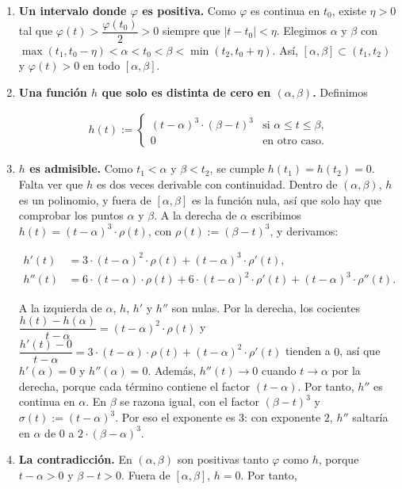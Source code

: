 \documentclass[11pt,a4paper,spanish]{book}
\begin{document}
\begin{enumerate}
\def\labelenumi{\arabic{enumi}.}
\item
  \textbf{Un intervalo donde \(\varphi\) es positiva.} Como \(\varphi\)
  es continua en \(t_0\), existe \(\eta > 0\) tal que
  \(\varphi(t) > \dfrac{\varphi(t_0)}{2} > 0\) siempre que
  \(|t - t_0| < \eta\). Elegimos \(\alpha\) y \(\beta\) con
  \(\max(t_1, t_0 - \eta) < \alpha < t_0 < \beta < \min(t_2, t_0 + \eta)\).
  Así, \([\alpha, \beta] \subset (t_1, t_2)\) y \(\varphi(t) > 0\) en
  todo \([\alpha, \beta]\).
\item
  \textbf{Una función \(h\) que solo es distinta de cero en
  \((\alpha, \beta)\).} Definimos

  \[
  \begin{aligned}
  h(t) := \begin{cases} (t - \alpha)^3 \cdot (\beta - t)^3 & \text{si } \alpha \leq t \leq \beta, \\ 0 & \text{en otro caso.} \end{cases}
  \end{aligned}
  \]
\item
  \textbf{\(h\) es admisible.} Como \(t_1 < \alpha\) y \(\beta < t_2\),
  se cumple \(h(t_1) = h(t_2) = 0\). Falta ver que \(h\) es dos veces
  derivable con continuidad. Dentro de \((\alpha, \beta)\), \(h\) es un
  polinomio, y fuera de \([\alpha, \beta]\) es la función nula, así que
  solo hay que comprobar los puntos \(\alpha\) y \(\beta\). A la derecha
  de \(\alpha\) escribimos \(h(t) = (t - \alpha)^3 \cdot \rho(t)\), con
  \(\rho(t) := (\beta - t)^3\), y derivamos:

  \[
  \begin{aligned}
  h'(t) &= 3 \cdot (t - \alpha)^2 \cdot \rho(t) + (t - \alpha)^3 \cdot \rho'(t), \\
  h''(t) &= 6 \cdot (t - \alpha) \cdot \rho(t) + 6 \cdot (t - \alpha)^2 \cdot \rho'(t) + (t - \alpha)^3 \cdot \rho''(t).
  \end{aligned}
  \]

  A la izquierda de \(\alpha\), \(h\), \(h'\) y \(h''\) son nulas. Por
  la derecha, los cocientes
  \(\dfrac{h(t) - h(\alpha)}{t - \alpha} = (t - \alpha)^2 \cdot \rho(t)\)
  y
  \(\dfrac{h'(t) - 0}{t - \alpha} = 3 \cdot (t - \alpha) \cdot \rho(t) + (t - \alpha)^2 \cdot \rho'(t)\)
  tienden a \(0\), así que \(h'(\alpha) = 0\) y \(h''(\alpha) = 0\).
  Además, \(h''(t) \to 0\) cuando \(t \to \alpha\) por la derecha,
  porque cada término contiene el factor \((t - \alpha)\). Por tanto,
  \(h''\) es continua en \(\alpha\). En \(\beta\) se razona igual, con
  el factor \((\beta - t)^3\) y \(\sigma(t) := (t - \alpha)^3\). Por eso
  el exponente es \(3\): con exponente \(2\), \(h''\) saltaría en
  \(\alpha\) de \(0\) a \(2 \cdot (\beta - \alpha)^3\).
\item
  \textbf{La contradicción.} En \((\alpha, \beta)\) son positivas tanto
  \(\varphi\) como \(h\), porque \(t - \alpha > 0\) y \(\beta - t > 0\).
  Fuera de \([\alpha, \beta]\), \(h = 0\). Por tanto,


\end{enumerate}
\end{document}
